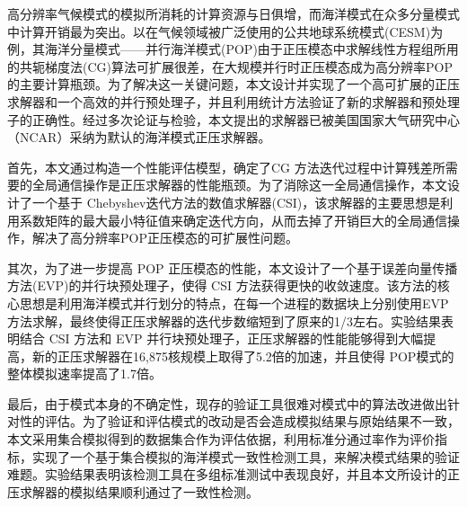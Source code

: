 \begin{cabstract}
  高分辨率气候模式的模拟所消耗的计算资源与日俱增，而海洋模式在众多分量模式中计算开销最为突出。以在气候领域被广泛使用的公共地球系统模式(CESM)为例，其海洋分量模式——并行海洋模式(POP)由于正压模态中求解线性方程组所用的共轭梯度法(CG)算法可扩展很差，在大规模并行时正压模态成为高分辨率POP的主要计算瓶颈。为了解决这一关键问题，本文设计并实现了一个高可扩展的正压求解器和一个高效的并行预处理子，并且利用统计方法验证了新的求解器和预处理子的正确性。经过多次论证与检验，本文提出的求解器已被美国国家大气研究中心（NCAR）采纳为默认的海洋模式正压求解器。

  首先，本文通过构造一个性能评估模型，确定了CG 方法迭代过程中计算残差所需要的全局通信操作是正压求解器的性能瓶颈。为了消除这一全局通信操作，本文设计了一个基于 Chebyshev迭代方法的数值求解器(CSI)，该求解器的主要思想是利用系数矩阵的最大最小特征值来确定迭代方向，从而去掉了开销巨大的全局通信操作，解决了高分辨率POP正压模态的可扩展性问题。

  其次，为了进一步提高 POP 正压模态的性能，本文设计了一个基于误差向量传播方法(EVP)的并行块预处理子，使得 CSI 方法获得更快的收敛速度。该方法的核心思想是利用海洋模式并行划分的特点，在每一个进程的数据块上分别使用EVP 方法求解，最终使得正压求解器的迭代步数缩短到了原来的1/3左右。实验结果表明结合 CSI 方法和 EVP 并行块预处理子，正压求解器的性能能够得到大幅提高，新的正压求解器在16,875核规模上取得了5.2倍的加速，并且使得 POP模式的整体模拟速率提高了1.7倍。

  最后，由于模式本身的不确定性，现存的验证工具很难对模式中的算法改进做出针对性的评估。为了验证和评估模式的改动是否会造成模拟结果与原始结果不一致，本文采用集合模拟得到的数据集合作为评估依据，利用标准分通过率作为评价指标，实现了一个基于集合模拟的海洋模式一致性检测工具，来解决模式结果的验证难题。实验结果表明该检测工具在多组标准测试中表现良好，并且本文所设计的正压求解器的模拟结果顺利通过了一致性检测。

\end{cabstract}


